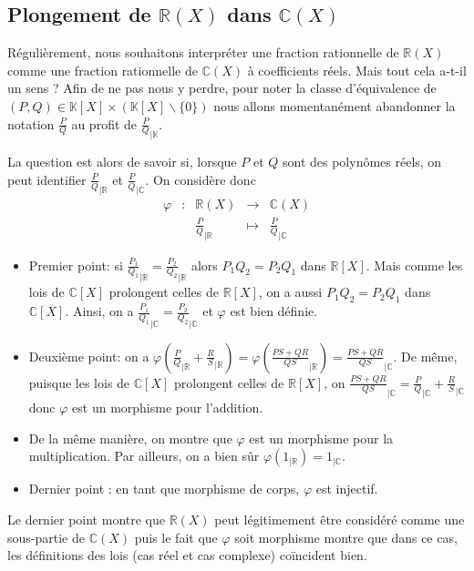 \documentclass[french]{book}
\newcommand{\R}{\mathbb{R}}
\newcommand{\C}{\mathbb{C}}
\newcommand{\K}{\mathbb{K}}
\theoremstyle{plain}
\theoremstyle{definition}
\theoremstyle{remark}
\begin{document}
\subsection{Plongement de $\mathbb{R}(X)$ dans $\mathbb{C}(X)$}
Régulièrement, nous souhaitons interpréter une fraction rationnelle de $\mathbb{R}(X)$ comme une fraction rationnelle de $\mathbb{C}(X)$ à coefficients réels. Mais tout cela a-t-il un	sens ? Afin de ne pas nous y perdre, pour noter la classe d'équivalence de $(P,Q)\in\mathbb{K}[X]\times(\mathbb{K}[X]\backslash\{0\})$ nous allons momentanément abandonner la notation $\displaystyle\frac{P}{Q}$	au profit de $\displaystyle\frac{P}{Q}_{|\K}$. \\ \par	
La question est alors de savoir si, lorsque $P$ et $Q$ sont des polynômes réels, on peut identifier $\displaystyle\frac{P}{Q}_{|\R}$ et $\displaystyle \frac{P}{Q}_{|\C}$. On considère donc $$\begin{array}{ccccc}\varphi&:&\mathbb{R}(X)&\rightarrow&\mathbb{C}(X) \\
	&&\displaystyle\frac{P}{Q}_{|\R}&\mapsto&\displaystyle\frac{P}{Q}_{|\C}
\end{array}$$
\begin{itemize}
	\item Premier point: si $\displaystyle\frac{P_{1}}{Q_{1}}_{|\R}=\frac{P_{2}}{Q_{2}}_{|\R}$ alors $P_{1}Q_{2}=P_{2}Q_{1}$ dans $\mathbb{R}[X]$. Mais comme les lois	de $\mathbb{C}[X]$ prolongent celles de $\mathbb{R}[X]$, on a aussi $P_{1}Q_{2}=P_{2}Q_{1}$ dans $\mathbb{C}[X]$. Ainsi, on a $\displaystyle\frac{P_{1}}{Q_{1}}_{|\C}=\frac{P_{2}}{Q_{2}}_{|\C}$ et $\varphi$ est bien définie.
	\item Deuxième point: on a $\displaystyle\varphi\left(\frac{P}{Q}_{|\R}+\frac{R}{S}_{|\R}\right)=\varphi\left(\frac{PS+QR}{QS}_{|\R}\right)=\frac{PS+QR}{QS}_{|\C}$. De même, puisque les lois de $\mathbb{C}[X]$ prolongent celles de $\mathbb{R}[X]$, on $\displaystyle\frac{PS+QR}{QS}_{|\C}=\frac{P}{Q}_{|\C}+\frac{R}{S}_{|\C}$ donc $\varphi$ est un morphisme pour l'addition.
	\item De la même manière, on montre que $\varphi$ est un morphisme pour la multiplication. Par ailleurs, on a bien sûr $\varphi(1_{|\R})=1_{|\C}$.
	\item Dernier point : en tant que morphisme de corps, $\varphi$ est injectif.
\end{itemize}
Le dernier point montre que $\mathbb{R}(X)$ peut légitimement être considéré comme une sous-partie de $\mathbb{C}(X)$ puis le fait que $\varphi$ soit morphisme montre que dans ce cas, les définitions des lois (cas réel et cas complexe) coïncident bien.
\end{document}
